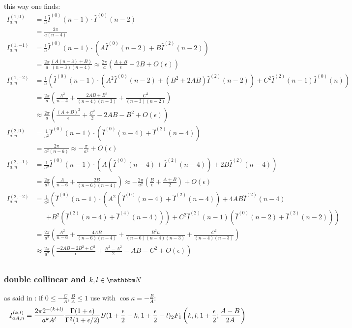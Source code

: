 this way one finds\cite[Ch. 5]{Bojak:2000eu}\cite[App. C]{PhysRevD.40.54}:
\begin{align}
I^{(1,0)}_{a,n} &= \frac 1 a\hat I^{(0)}(n-1) \cdot \hat I^{(0)}(n-2)\\
 &= \frac {2\pi}{a(n-4)}\\
I^{(1,-1)}_{a,n} &= \frac 1 a\hat I^{(0)}(n-1)\cdot \left(A\hat I^{(0)}(n-2)+B\hat I^{(2)}(n-2)\right)\\
 &= \frac {2\pi}{a}\frac{(A(n-3)+B)}{(n-3)(n-4)} \approx \frac {2\pi}{a}\left(\frac{A+B}\epsilon - 2B + O(\epsilon)\right)\\
I^{(1,-2)}_{a,n} &= \frac 1 a\left(\hat I^{(0)}(n-1)\cdot \left(A^2\hat I^{(0)}(n-2)+(B^2+2AB)\hat I^{(2)}(n-2)\right) + C^2\hat I^{(2)}(n-1)\hat I^{(0)}(n)\right)\\
 &= \frac {2\pi}{a}\left(\frac {A^2}{n-4} + \frac {2AB + B^2}{(n-4)(n-3)} + \frac {C^2}{(n-3)(n-2)}\right) \\
 &\approx \frac {2\pi}{a}\left(\frac{(A+B)^2}{\epsilon}+\frac{C^2}{2}-2AB-B^2+O(\epsilon)\right)\\
I^{(2,0)}_{a,n} &= \frac 1 {a^2}\hat I^{(0)}(n-1) \cdot \left(\hat I^{(0)}(n-4) + \hat I^{(2)}(n-4)\right)\\
 &= \frac {2\pi}{a^2(n-6)} \approx -\frac {\pi}{a^2} + O(\epsilon)\\
I^{(2,-1)}_{a,n} &= \frac 1 {a^2}\hat I^{(0)}(n-1) \cdot \left(A\left(\hat I^{(0)}(n-4) + \hat I^{(2)}(n-4)\right) + 2B\hat I^{(2)}(n-4)\right)\\
 &= \frac {2\pi}{a^2}\left(\frac{A}{n-6}+\frac{2B}{(n-6)(n-4)}\right)\approx -\frac{2\pi}{a^2}\left(\frac{B}{\epsilon} + \frac{A+B} 2\right) + O(\epsilon)\\
I^{(2,-2)}_{a,n} &= \frac 1 {a^2}\left(\hat I^{(0)}(n-1)\cdot \left(A^2(\hat I^{(0)}(n-4)+\hat I^{(2)}(n-4))+4AB\hat I^{(2)}(n-4) \right.\right.\nonumber\\
 &\hspace{20pt}\left.\left. + B^2(\hat I^{(2)}(n-4)+\hat I^{(4)}(n-4))\right) + C^2\hat I^{(2)}(n-1)(\hat I^{(0)}(n-2) + \hat I^{(2)}(n-2))\right)\\
 &= \frac {2\pi}{a^2}\left(\frac {A^2}{n-6}+\frac{4AB}{(n-6)(n-4)} + \frac{B^2 n}{(n-6)(n-4)(n-3)} + \frac{C^2}{(n-4)(n-3)} \right) \\
 &\approx \frac {2\pi}{a^2}\left(\frac{-2AB-2B^2+C^2}{\epsilon}+\frac{B^2-A^2}{2}-AB-C^2+O(\epsilon)\right)\\
\end{align}

\subsubsection{double collinear and $k,l\in\mathbbm N$}
as said in \cite[Ch. 5]{Bojak:2000eu}: if $0\leq -\frac{C}{A},\frac B A \leq 1$ use \cite[eq. A11]{van_neerven_dimensional_1986} with $\cos\kappa = -\frac B A$:
\begin{equation}
I_{aA,n}^{(k,l)} = \frac{2\pi 2^{-(k+l)}}{a^kA^l}\frac{\Gamma(1+\epsilon)}{\Gamma^2(1+\epsilon/2)} B(1+\frac \epsilon 2 - k, 1+ \frac \epsilon 2 -l) {}_{2}F_{1} \left(k,l;1+\frac \epsilon 2; \frac{A-B}{2A}\right)
\end{equation}

